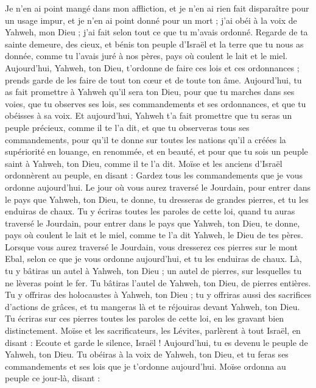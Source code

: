 \begin{multicols}{2}
Je n'en ai point mangé dans mon affliction, et je n'en ai rien fait disparaître pour un usage impur, et je n'en ai point donné pour un mort ; j'ai obéi à la voix de Yahweh, mon Dieu ; j'ai fait selon tout ce que tu m'avais ordonné.
Regarde de ta sainte demeure, des cieux, et bénis ton peuple d'Israël et la terre que tu nous as donnée, comme tu l’avais juré à nos pères, pays où coulent le lait et le miel.
Aujourd'hui, Yahweh, ton Dieu, t’ordonne de faire ces lois et ces ordonnances ; prends garde de les faire de tout ton cœur et de toute ton âme.
Aujourd’hui, tu as fait promettre à Yahweh qu'il sera ton Dieu, pour que tu marches dans ses voies, que tu observes ses lois, ses commandements et ses ordonnances, et que tu obéisses à sa voix.
Et aujourd’hui, Yahweh t’a fait promettre que tu seras un peuple précieux, comme il te l’a dit, et que tu observeras tous ses commandements,
pour qu’il te donne sur toutes les nations qu'il a créées la supériorité en louange, en renommée, et en beauté, et pour que tu sois un peuple saint à Yahweh, ton Dieu, comme il te l’a dit.
\VerseOne{}Moïse et les anciens d'Israël ordonnèrent au peuple, en disant : Gardez tous les commandements que je vous ordonne aujourd'hui.
Le jour où vous aurez traversé le Jourdain, pour entrer dans le pays que Yahweh, ton Dieu, te donne, tu dresseras de grandes pierres, et tu les enduiras de chaux.
Tu y écriras toutes les paroles de cette loi, quand tu auras traversé le Jourdain, pour entrer dans le pays que Yahweh, ton Dieu, te donne, pays où coulent le lait et le miel, comme te l’a dit Yahweh, le Dieu de tes pères.
Lorsque vous aurez traversé le Jourdain, vous dresserez ces pierres sur le mont Ebal, selon ce que je vous ordonne aujourd'hui, et tu les enduiras de chaux.
Là, tu y bâtiras un autel à Yahweh, ton Dieu ; un autel de pierres, sur lesquelles tu ne lèveras point le fer.
Tu bâtiras l'autel de Yahweh, ton Dieu, de pierres entières. Tu y offriras des holocaustes à Yahweh, ton Dieu ;
tu y offriras aussi des sacrifices d’actions de grâces, et tu mangeras là et te réjouiras devant Yahweh, ton Dieu.
Tu écriras sur ces pierres toutes les paroles de cette loi, en les gravant bien distinctement.
Moïse et les sacrificateurs, les Lévites, parlèrent à tout Israël, en disant : Ecoute et garde le silence, Israël ! Aujourd'hui, tu es devenu le peuple de Yahweh, ton Dieu.
Tu obéiras à la voix de Yahweh, ton Dieu, et tu feras ses commandements et ses lois que je t’ordonne aujourd'hui.
Moïse ordonna au peuple ce jour-là, disant :

\end{multicols}

